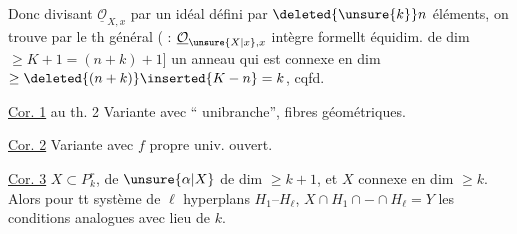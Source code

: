 
Donc divisant $\underline{\mathcal O}_{X,x}$ par un idéal défini par $\deleted{\unsure{k}}n$ éléments, on  trouve par le th général  ( : $\underline{\mathcal O}_{\unsure{X|x},x}$ intègre formellt équidim. de dim $\geq K+1=(n+k)+1$] un anneau qui est connexe en dim $\geq\deleted{(n+k)}\inserted{K-n}=k$, cqfd.

\uline{Cor. 1} au th. 2 Variante avec  ``  unibranche'',   fibres géométriques.

\uline{Cor. 2} Variante avec $f$ propre univ. ouvert.

\uline{Cor. 3} $X\subset P^r_k$,   de $\unsure{\alpha|X}$ de dim $\geq k+1$, et $X$ connexe en dim $\geq k$. Alors pour tt système de $\ell$ hyperplans $H_1\text{--}H_\ell$,   $X\cap H_1\cap-\cap H_\ell=Y$  les conditions analogues avec  lieu de $k$.

